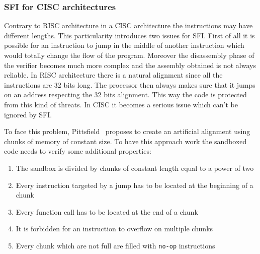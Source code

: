 \documentclass[11pt]{sdm}
\begin{document}
\subsubsection{SFI for CISC architectures}
\label{ssub:SFI for CISC architectures}
	Contrary to RISC architecture in a CISC architecture the instructions may have different lengths. This particularity introduces two issues for SFI. First of all it is possible for an instruction to jump in the middle of another instruction which would totally change the flow of the program. Moreover the disassembly phase of the verifier becomes much more complex and the assembly obtained is not always reliable.
In RISC architecture there is a natural alignment since all the instructions are 32 bits long. The processor then always makes sure that it jumps on an address respecting the 32 bits alignment. This way the code is protected from this kind of threats. In CISC it becomes a serious issue which can't be ignored by SFI.

To face this problem, Pittsfield~\cite{Mccamant_evaluatingsfi} proposes to create an artificial alignment using chunks of memory of constant size. To have this approach work the sandboxed code needs to verify some additional properties:
\begin{enumerate}
	\item The sandbox is divided by chunks of constant length equal to a power of two
	\item Every instruction targeted by a jump has to be located at the beginning of a chunk
	\item Every function call has to be located at the end of a chunk
	\item It is forbidden for an instruction to overflow on multiple chunks
	\item Every chunk which are not full are filled with \texttt{no-op} instructions
\end{enumerate}
\end{document}
